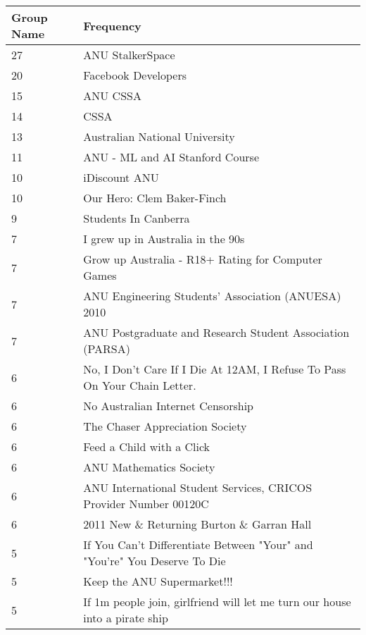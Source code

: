 \begin{table}[!htbp]
\centering
	\begin{tabular}{|l|l|} %
		\hline
		\textbf{Group Name} & \textbf{Frequency}  \\ \hline
		27 & ANU StalkerSpace \\ \hline
		20 & Facebook Developers \\ \hline
		15 & ANU CSSA \\ \hline
		14 & CSSA \\ \hline
		13 & Australian National University \\ \hline
		11 & ANU - ML and AI Stanford Course \\ \hline
		10 & iDiscount ANU \\ \hline
		10 & Our Hero: Clem Baker-Finch \\ \hline
		9 & Students In Canberra \\ \hline
		7 & I grew up in Australia in the 90s \\ \hline
		7 & Grow up Australia - R18+ Rating for Computer Games \\ \hline
		7 & ANU Engineering Students' Association (ANUESA) 2010 \\ \hline
		7 & ANU Postgraduate and Research Student Association (PARSA) \\ \hline
		6 & No, I Don't Care If I Die At 12AM, I Refuse To Pass On Your Chain Letter. \\ \hline
		6 & No Australian Internet Censorship \\ \hline
		6 & The Chaser Appreciation Society \\ \hline
		6 & Feed a Child with a Click \\ \hline
		6 & ANU Mathematics Society \\ \hline
		6 & ANU International Student Services, CRICOS Provider Number 00120C \\ \hline
		6 & 2011 New \& Returning Burton \& Garran Hall \\ \hline
		5 & If You Can't Differentiate Between "Your" and "You're" You Deserve To Die \\ \hline
		5 & Keep the ANU Supermarket!!! \\ \hline
		5 & If 1m people join, girlfriend will let me turn our house into a pirate ship \\ \hline

\end{tabular}
\end{table}
